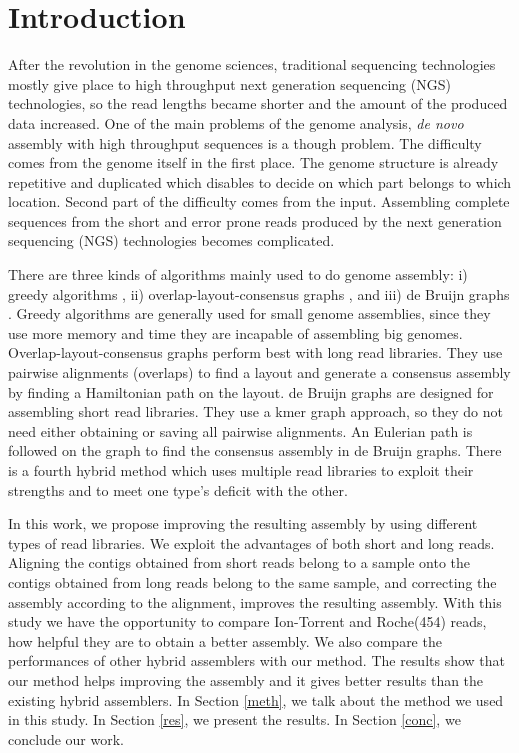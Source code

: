 \documentclass[12pt]{article}
\begin{document}
\section{Introduction}

After the revolution in the genome sciences, traditional sequencing technologies mostly give place to high throughput next generation sequencing (NGS) technologies, so the read lengths became shorter and the amount of the produced data increased. One of the main problems of the genome analysis, \textit{de novo} assembly with high throughput sequences is a though problem. The difficulty comes from the genome itself in the first place. The genome structure is already repetitive and duplicated which disables to decide on which part belongs to which location. Second part of the difficulty comes from the input. Assembling complete sequences from the short and error prone reads produced by the next generation sequencing (NGS) technologies becomes complicated.

There are three kinds of algorithms mainly used to do genome assembly: i) greedy algorithms \cite{ssake:2007,sharcgs:2007,vcake:2007}, ii) overlap-layout-consensus graphs \cite{celera:2000, sga:2012, hapsemblerDonmez:2011}, and iii) de Bruijn graphs \cite{eulerPevzner:2008, zerbino:2009, abyssSimpson:2009, allpaths:2008, soapdenovo:2009}. Greedy algorithms are generally used for small genome assemblies, since they use more memory and time they are incapable of assembling big genomes. Overlap-layout-consensus graphs perform best with long read libraries. They use pairwise alignments (overlaps) to find a layout and generate a consensus assembly by finding a Hamiltonian path on the layout. de Bruijn graphs are designed for assembling short read libraries. They use a kmer graph approach, so they do not need either obtaining or saving all pairwise alignments. An Eulerian path is followed on the graph to find the consensus assembly in de Bruijn graphs. There is a fourth hybrid method which uses multiple read libraries to exploit their strengths and to meet one type's deficit with the other.

In this work, we propose improving the resulting assembly by using different types of read libraries. We exploit the advantages of both short and long reads. Aligning the contigs obtained from short reads belong to a sample onto the contigs obtained from long reads belong to the same sample, and correcting the assembly according to the alignment, improves the resulting assembly. With this study we have the opportunity to compare Ion-Torrent and Roche(454) reads, how helpful they are to obtain a better assembly. We also compare the performances of other hybrid assemblers with our method. The results show that our method helps improving the assembly and it gives better results than the existing hybrid assemblers. In Section \ref{meth}, we talk about the method we used in this study. In Section \ref{res}, we present the results. In Section \ref{conc}, we conclude our work.
\end{document}
